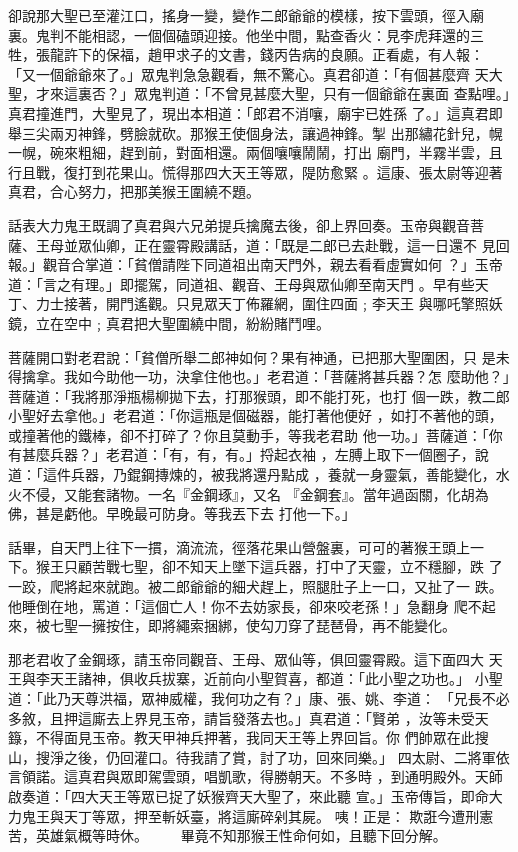 \begin{pinyinscope}
{卻說那大聖已至灌江口，搖身一變，變作二郎爺爺的模樣，按下雲頭，徑入廟
裏。鬼判不能相認，一個個磕頭迎接。他坐中間，點查香火：見李虎拜還的三
牲，張龍許下的保福，趙甲求子的文書，錢丙告病的良願。正看處，有人報：
「又一個爺爺來了。」眾鬼判急急觀看，無不驚心。真君卻道：「有個甚麼齊
天大聖，才來這裏否？」眾鬼判道：「不曾見甚麼大聖，只有一個爺爺在裏面
查點哩。」真君撞進門，大聖見了，現出本相道：「郎君不消嚷，廟宇已姓孫
了。」這真君即舉三尖兩刃神鋒，劈臉就砍。那猴王使個身法，讓過神鋒。掣
出那繡花針兒，幌一幌，碗來粗細，趕到前，對面相還。兩個嚷嚷鬧鬧，打出
廟門，半霧半雲，且行且戰，復打到花果山。慌得那四大天王等眾，隄防愈緊
。這康、張太尉等迎著真君，合心努力，把那美猴王圍繞不題。

話表大力鬼王既調了真君與六兄弟提兵擒魔去後，卻上界回奏。玉帝與觀音菩
薩、王母並眾仙卿，正在靈霄殿講話，道：「既是二郎已去赴戰，這一日還不
見回報。」觀音合掌道：「貧僧請陛下同道祖出南天門外，親去看看虛實如何
？」玉帝道：「言之有理。」即擺駕，同道祖、觀音、王母與眾仙卿至南天門
。早有些天丁、力士接著，開門遙觀。只見眾天丁佈羅網，圍住四面﹔李天王
與哪吒擎照妖鏡，立在空中﹔真君把大聖圍繞中間，紛紛賭鬥哩。

菩薩開口對老君說：「貧僧所舉二郎神如何？果有神通，已把那大聖圍困，只
是未得擒拿。我如今助他一功，決拿住他也。」老君道：「菩薩將甚兵器？怎
麼助他？」菩薩道：「我將那淨瓶楊柳拋下去，打那猴頭，即不能打死，也打
個一跌，教二郎小聖好去拿他。」老君道：「你這瓶是個磁器，能打著他便好
，如打不著他的頭，或撞著他的鐵棒，卻不打碎了？你且莫動手，等我老君助
他一功。」菩薩道：「你有甚麼兵器？」老君道：「有，有，有。」捋起衣袖
，左膊上取下一個圈子，說道：「這件兵器，乃錕鋼摶煉的，被我將還丹點成
，養就一身靈氣，善能變化，水火不侵，又能套諸物。一名『金鋼琢』，又名
『金鋼套』。當年過函關，化胡為佛，甚是虧他。早晚最可防身。等我丟下去
打他一下。」

話畢，自天門上往下一摜，滴流流，徑落花果山營盤裏，可可的著猴王頭上一
下。猴王只顧苦戰七聖，卻不知天上墜下這兵器，打中了天靈，立不穩腳，跌
了一跤，爬將起來就跑。被二郎爺爺的細犬趕上，照腿肚子上一口，又扯了一
跌。他睡倒在地，罵道：「這個亡人！你不去妨家長，卻來咬老孫！」急翻身
爬不起來，被七聖一擁按住，即將繩索捆綁，使勾刀穿了琵琶骨，再不能變化。

那老君收了金鋼琢，請玉帝同觀音、王母、眾仙等，俱回靈霄殿。這下面四大
天王與李天王諸神，俱收兵拔寨，近前向小聖賀喜，都道：「此小聖之功也。」
小聖道：「此乃天尊洪福，眾神威權，我何功之有？」康、張、姚、李道：
「兄長不必多敘，且押這廝去上界見玉帝，請旨發落去也。」真君道：「賢弟
，汝等未受天籙，不得面見玉帝。教天甲神兵押著，我同天王等上界回旨。你
們帥眾在此搜山，搜淨之後，仍回灌口。待我請了賞，討了功，回來同樂。」
四太尉、二將軍依言領諾。這真君與眾即駕雲頭，唱凱歌，得勝朝天。不多時
，到通明殿外。天師啟奏道：「四大天王等眾已捉了妖猴齊天大聖了，來此聽
宣。」玉帝傳旨，即命大力鬼王與天丁等眾，押至斬妖臺，將這廝碎剁其屍。
咦！正是：
    欺誑今遭刑憲苦，英雄氣概等時休。
　　畢竟不知那猴王性命何如，且聽下回分解。





}
\end{pinyinscope}
